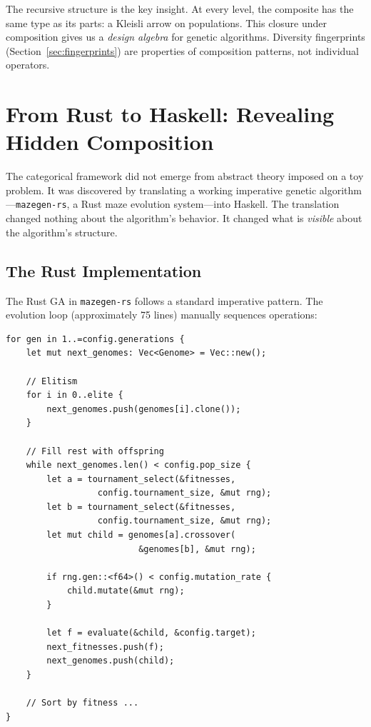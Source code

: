 \documentclass[dvipsnames,format=sigconf,anonymous=true,review=false]{acmart}
\begin{document}
The recursive structure is the key insight. At every level, the composite has the same type as its parts: a Kleisli arrow on populations. This closure under composition gives us a \emph{design algebra} for genetic algorithms. Diversity fingerprints (Section~\ref{sec:fingerprints}) are properties of composition patterns, not individual operators.

\section{From Rust to Haskell: Revealing Hidden Composition}

The categorical framework did not emerge from abstract theory imposed on a toy problem. It was discovered by translating a working imperative genetic algorithm---\texttt{mazegen-rs}, a Rust maze evolution system---into Haskell. The translation changed nothing about the algorithm's behavior. It changed what is \emph{visible} about the algorithm's structure.

\subsection{The Rust Implementation}

The Rust GA in \texttt{mazegen-rs} follows a standard imperative pattern. The evolution loop (approximately 75 lines) manually sequences operations:

\begin{lstlisting}[style=ruststyle]
for gen in 1..=config.generations {
    let mut next_genomes: Vec<Genome> = Vec::new();

    // Elitism
    for i in 0..elite {
        next_genomes.push(genomes[i].clone());
    }

    // Fill rest with offspring
    while next_genomes.len() < config.pop_size {
        let a = tournament_select(&fitnesses,
                  config.tournament_size, &mut rng);
        let b = tournament_select(&fitnesses,
                  config.tournament_size, &mut rng);
        let mut child = genomes[a].crossover(
                          &genomes[b], &mut rng);

        if rng.gen::<f64>() < config.mutation_rate {
            child.mutate(&mut rng);
        }

        let f = evaluate(&child, &config.target);
        next_fitnesses.push(f);
        next_genomes.push(child);
    }

    // Sort by fitness ...
}
\end{lstlisting}
\end{document}
